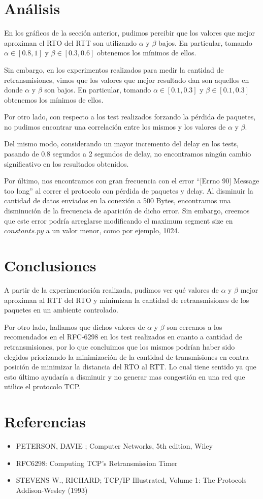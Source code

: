 \documentclass[10pt, a4paper]{article}
\begin{document}
\newpage
\section{Análisis}
En los gráficos de la sección anterior, pudimos percibir que los valores que mejor aproximan el RTO del RTT son utilizando $\alpha$ y $\beta$ bajos. En particular, tomando $ \alpha \in [0.8,1]$ y $ \beta \in [0.3,0.6]$ obtenemos los mínimos de ellos. 

Sin embargo, en los experimentos realizados para medir la cantidad de retransmisiones, vimos que los valores que mejor resultado dan son aquellos en donde $\alpha$ y $\beta$ son bajos. En particular, tomando $\alpha \in [0.1,0.3]$ y $\beta \in [0.1,0.3]$ obtenemos los mínimos de ellos.

Por otro lado, con respecto a los test realizados forzando la pérdida de paquetes, no pudimos encontrar una correlación entre los mismos y los valores de $\alpha$ y $\beta$.

Del mismo modo, considerando un mayor incremento del delay en los tests, pasando de 0.8 segundos a 2 segundos de delay, no encontramos ningún cambio significativo en los resultados obtenidos.

Por último, nos encontramos con gran frecuencia con el error ``[Errno 90] Message too long'' al correr el protocolo con pérdida de paquetes y delay. Al disminuir la cantidad de datos enviados en la conexión a 500 Bytes, encontramos una disminución de la frecuencia de aparición de dicho error. Sin embargo, creemos que este error podría arreglarse modificando el maximum segment size en $constants.py$ a un valor menor, como por ejemplo, 1024. 

\section{Conclusiones}
A partir de la experimentación realizada, pudimos ver qué valores de $\alpha$ y $\beta$ mejor aproximan al RTT del RTO y minimizan la cantidad de retransmisiones de los paquetes en un ambiente controlado.

Por otro lado, hallamos que dichos valores de $\alpha$ y $\beta$ son cercanos a los recomendados en el RFC-6298 en los test realizados en cuanto a cantidad de retransmisiones, por lo que concluimos que los mismos podrían haber sido elegidos priorizando la minimización de la cantidad de transmisiones en contra posición de minimizar la distancia del RTO al RTT. Lo cual tiene sentido ya que esto último ayudaría a disminuir y no generar mas congestión en una red que utilice el protocolo TCP.

\section{Referencias}
\begin{itemize}
\item PETERSON, DAVIE ; Computer Networks, 5th edition, Wiley

\item{RFC6298: Computing TCP's Retransmission Timer}

\item{STEVENS W., RICHARD; TCP/IP Illustrated, Volume 1: The Protocols Addison-Wesley (1993)}

\end{itemize}
\end{document}
